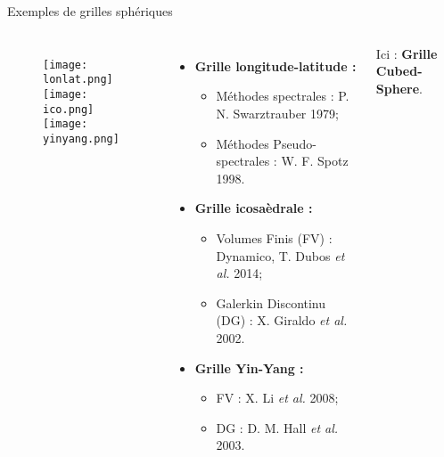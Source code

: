 \documentclass[11pt]{beamer}
\begin{document}
\section{}
\begin{frame}{Exemples de grilles sphériques}
\begin{columns}
\begin{figure}[htbp]
\begin{center}
\texttt{[image: lonlat.png]}\\
\texttt{[image: ico.png]}\\
\texttt{[image: yinyang.png]}\\
\end{center}
\end{figure}

\begin{itemize}
\item \textbf{Grille longitude-latitude : }
\begin{tiny}
\begin{itemize}
\item Méthodes spectrales : P. N. Swarztrauber 1979;
\item Méthodes Pseudo-spectrales : W. F. Spotz 1998.
\end{itemize} 
\end{tiny}
\vspace{.4cm}

\item \textbf{Grille icosaèdrale : }
\begin{tiny}
\begin{itemize}
\item Volumes Finis (FV) : Dynamico, T. Dubos \textit{et al.} 2014;
\item Galerkin Discontinu (DG) : X. Giraldo \textit{et al.} 2002.
\end{itemize}
\end{tiny}
\vspace{.4cm}

\item \textbf{Grille Yin-Yang : } 
\begin{tiny}
\begin{itemize}
\item FV : X. Li \textit{et al.} 2008;
\item DG : D. M. Hall \textit{et al.} 2003.
\end{itemize}
\end{tiny}
\end{itemize}
\vspace{.2cm}

\pause
Ici : \textbf{Grille Cubed-Sphere}.

\end{columns}
\end{frame}
\end{document}
